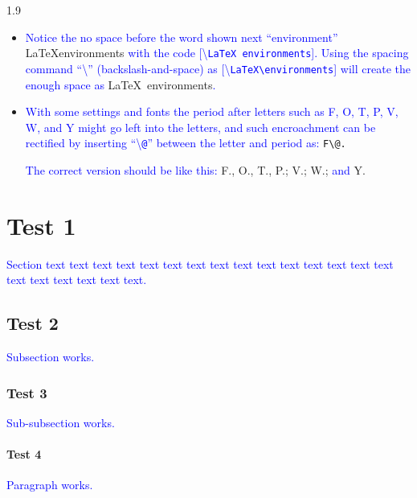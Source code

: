 \documentclass[phd]{ndsu-thesis-2022}
\newcommand\myspacing{1.9} %
\newcommand\italk[1]{\textcolor{blue}{#1}}  %
\newcommand\cmd[1]{\textbackslash\texttt{#1}}  %
\begin{document}
\begin{spacing}{\myspacing}
\begin{itemize}
\item
\italk{Notice the no space before the word shown next ``environment''}  \LaTeX environments \italk{with the code [\cmd{LaTeX environments}]. Using the spacing command ``\cmd{\:}'' (backslash-and-space) as [\cmd{LaTeX\textbackslash\:environments}] will create the enough space as} \LaTeX\ environments\italk{.}

\item
\italk{With some settings and fonts the period after letters such as F, O, T, P, V, W, and Y might go left into the letters, and such encroachment can be rectified by inserting ``\cmd{@}'' between the letter and period as:} {\LARGE{\verb|F\@.|}} 

\italk{The correct version should be like this:} {\LARGE F\@., O\@., T\@., P\@.; V\@.; W\@.;} \italk{and} {\LARGE Y\@.}


\end{itemize}


\section{Test 1}
\italk{Section text text text text text text text text text text text text text text text text text text text text text.}

\subsection{Test 2}
\italk{Subsection works.}

\subsubsection{Test 3}
\italk{Sub-subsection works.} 
\kant[3]

\paragraph{Test 4}
\italk{Paragraph works.} 


\renewcommand{\bibname}{REFERENCES}


\end{spacing}
\end{document}
